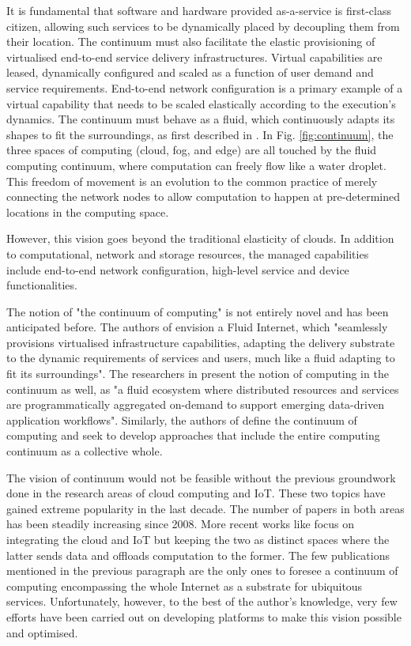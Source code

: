 It is fundamental that software and hardware provided as-a-service is first-class citizen, allowing such services to be dynamically placed by decoupling them from their location. The continuum must also facilitate the elastic provisioning of virtualised end-to-end service delivery infrastructures. Virtual capabilities are leased, dynamically configured and scaled as a function of user demand and service requirements. End-to-end network configuration is a primary example of a virtual capability that needs to be scaled elastically according to the execution's dynamics. The continuum must behave as a fluid, which continuously adapts its shapes to fit the surroundings, as first described in \cite{fluid-internet}. In Fig. \ref{fig:continuum}, the three spaces of computing (cloud, fog, and edge) are all touched by the fluid computing continuum, where computation can freely flow like a water droplet. This freedom of movement is an evolution to the common practice of merely connecting the network nodes to allow computation to happen at pre-determined locations in the computing space.

However, this vision goes beyond the traditional elasticity of clouds. In addition to computational, network and storage resources, the managed capabilities include end-to-end network configuration, high-level service and device functionalities.

The notion of "the continuum of computing" is not entirely novel and has been anticipated before. The authors of \cite{fluid-internet} envision a Fluid Internet, which "seamlessly provisions virtualised infrastructure capabilities, adapting the delivery substrate to the dynamic requirements of services and users, much like a fluid adapting to fit its surroundings". The researchers in \cite{computing-in-continuum} present the notion of computing in the continuum as well, as "a fluid ecosystem where distributed resources and services are programmatically aggregated on-demand to support emerging data-driven application workflows". Similarly, the authors of \cite{harnessing-continuum} define the continuum of computing and seek to develop approaches that include the entire computing continuum as a collective whole.

The vision of continuum would not be feasible without the previous groundwork done in the research areas of cloud computing and IoT. These two topics have gained extreme popularity in the last decade. The number of papers in both areas has been steadily increasing since 2008. More recent works like \cite{cloud-iot} focus on integrating the cloud and IoT but keeping the two as distinct spaces where the latter sends data and offloads computation to the former. The few publications mentioned in the previous paragraph are the only ones to foresee a continuum of computing encompassing the whole Internet as a substrate for ubiquitous services. Unfortunately, however, to the best of the author's knowledge, very few efforts have been carried out on developing platforms to make this vision possible and optimised.

